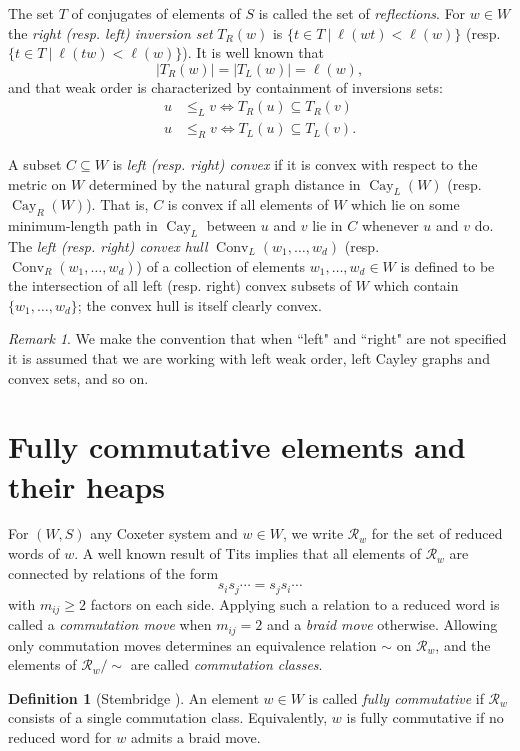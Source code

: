 \documentclass{amsart}
\DeclareMathOperator{\conv}{Conv}
\DeclareMathOperator{\cay}{Cay}
\newcommand{\mc}{\mathcal}
\theoremstyle{definition}
\newtheorem{defin}[theorem]{Definition}
\theoremstyle{remark}
\newtheorem*{remark}{Remark}
\begin{document}
The set $T$ of conjugates of elements of $S$ is called the set of \emph{reflections}.  For $w \in W$ the \emph{right (resp. left) inversion set} $T_R(w)$ is $\{t \in T \: | \: \ell(wt)<\ell(w)\}$ (resp. $\{t \in T \: | \: \ell(tw)<\ell(w)\}$).  It is well known that
\[
|T_R(w)|=|T_L(w)|=\ell(w),
\]
and that weak order is characterized by containment of inversions sets:
\begin{align*}
   u &\leq_L v \iff T_R(u) \subseteq T_R(v) \\
   u &\leq_R v \iff T_L(u) \subseteq T_L(v).
\end{align*}

A subset $C \subseteq W$ is \emph{left (resp. right) convex} if it is convex with respect to the metric on $W$ determined by the natural graph distance in $\cay_L(W)$ (resp. $\cay_R(W)$).  That is, $C$ is convex if all elements of $W$ which lie on some minimum-length path in $\cay_L$ between $u$ and $v$ lie in $C$ whenever $u$ and $v$ do.  The \emph{left (resp. right) convex hull} $\conv_L(w_1,\ldots, w_d)$ (resp. $\conv_R(w_1,\ldots, w_d)$) of a collection of elements $w_1, \ldots, w_d \in W$ is defined to be the intersection of all left (resp. right) convex subsets of $W$ which contain $\{w_1,\ldots,w_d\}$; the convex hull is itself clearly convex.

\begin{remark}
We make the convention that when ``left" and ``right" are not specified it is assumed that we are working with left weak order, left Cayley graphs and convex sets, and so on.
\end{remark}
\section*{Fully commutative elements and their heaps}
For $(W,S)$ any Coxeter system and $w \in W$, we write $\mc{R}_w$ for the set of reduced words of $w$.  A well known result of Tits \cite{Tits-words} implies that all elements of $\mc{R}_w$ are connected by relations of the form
\[
s_is_j \cdots = s_js_i \cdots
\]
with $m_{ij} \geq 2$ factors on each side.  Applying such a relation to a reduced word is called a \emph{commutation move} when $m_{ij}=2$ and a \emph{braid move} otherwise.  Allowing only commutation moves determines an equivalence relation $\sim$ on $\mathcal{R}_w$, and the elements of $\mathcal{R}_w / \sim$ are called \emph{commutation classes}.

\begin{defin}[Stembridge \cite{Stembridge}]
An element $w \in W$ is called \emph{fully commutative} if $\mc{R}_w$ consists of a single commutation class.  Equivalently, $w$ is fully commutative if no reduced word for $w$ admits a braid move.
\end{defin}
\end{document}
